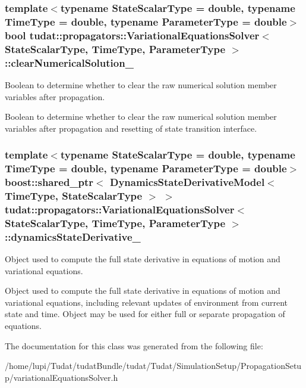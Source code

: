 \subsubsection[{\texorpdfstring{clear\+Numerical\+Solution\+\_\+}{clearNumericalSolution_}}]{\setlength{\rightskip}{0pt plus 5cm}template$<$typename State\+Scalar\+Type  = double, typename Time\+Type  = double, typename Parameter\+Type  = double$>$ bool {\bf tudat\+::propagators\+::\+Variational\+Equations\+Solver}$<$ State\+Scalar\+Type, Time\+Type, Parameter\+Type $>$\+::clear\+Numerical\+Solution\+\_\+\hspace{0.3cm}{\ttfamily [protected]}}\hypertarget{classtudat_1_1propagators_1_1VariationalEquationsSolver_af7c2f15b08a06114fe9a2b899e3a4382}{}\label{classtudat_1_1propagators_1_1VariationalEquationsSolver_af7c2f15b08a06114fe9a2b899e3a4382}


Boolean to determine whether to clear the raw numerical solution member variables after propagation. 

Boolean to determine whether to clear the raw numerical solution member variables after propagation and resetting of state transition interface. 
\subsubsection[{\texorpdfstring{dynamics\+State\+Derivative\+\_\+}{dynamicsStateDerivative_}}]{\setlength{\rightskip}{0pt plus 5cm}template$<$typename State\+Scalar\+Type  = double, typename Time\+Type  = double, typename Parameter\+Type  = double$>$ boost\+::shared\+\_\+ptr$<$ {\bf Dynamics\+State\+Derivative\+Model}$<$ Time\+Type, State\+Scalar\+Type $>$ $>$ {\bf tudat\+::propagators\+::\+Variational\+Equations\+Solver}$<$ State\+Scalar\+Type, Time\+Type, Parameter\+Type $>$\+::dynamics\+State\+Derivative\+\_\+\hspace{0.3cm}{\ttfamily [protected]}}\hypertarget{classtudat_1_1propagators_1_1VariationalEquationsSolver_a4b2adaa9bdcae6706d5413878790aa41}{}\label{classtudat_1_1propagators_1_1VariationalEquationsSolver_a4b2adaa9bdcae6706d5413878790aa41}


Object used to compute the full state derivative in equations of motion and variational equations. 

Object used to compute the full state derivative in equations of motion and variational equations, including relevant updates of environment from current state and time. Object may be used for either full or separate propagation of equations. 

The documentation for this class was generated from the following file\+:\begin{DoxyCompactItemize}
\item 
/home/lupi/\+Tudat/tudat\+Bundle/tudat/\+Tudat/\+Simulation\+Setup/\+Propagation\+Setup/variational\+Equations\+Solver.\+h\end{DoxyCompactItemize}
